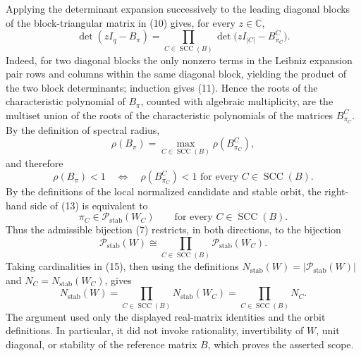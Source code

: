 Applying the determinant expansion successively to the leading diagonal blocks of the block-triangular matrix in (10) gives, for every \(z\in\mathbb C\),
\[
 \det(zI_q-B_\pi)
 =\prod_{C\in\operatorname{SCC}(B)}
   \det\bigl(zI_{|C|}-B^C_{\pi_C}\bigr). \tag{11}
\]
Indeed, for two diagonal blocks the only nonzero terms in the Leibniz expansion pair rows and columns within the same diagonal block, yielding the product of the two block determinants; induction gives (11). Hence the roots of the characteristic polynomial of \(B_\pi\), counted with algebraic multiplicity, are the multiset union of the roots of the characteristic polynomials of the matrices \(B^C_{\pi_C}\). By the definition of spectral radius,
\[
 \rho(B_\pi)
 =\max_{C\in\operatorname{SCC}(B)}\rho(B^C_{\pi_C}), \tag{12}
\]
and therefore
\[
 \rho(B_\pi)<1
 \quad\Longleftrightarrow\quad
 \rho(B^C_{\pi_C})<1
 \text{ for every }C\in\operatorname{SCC}(B). \tag{13}
\]
By the definitions of the local normalized candidate and stable orbit, the right-hand side of (13) is equivalent to
\[
 \pi_C\in\mathcal P_{\mathrm{stab}}(W_C)
 \qquad\text{for every }C\in\operatorname{SCC}(B). \tag{14}
\]
Thus the admissible bijection (7) restricts, in both directions, to the bijection
\[
 \mathcal P_{\mathrm{stab}}(W)
 \cong
 \prod_{C\in\operatorname{SCC}(B)}\mathcal P_{\mathrm{stab}}(W_C). \tag{15}
\]
Taking cardinalities in (15), then using the definitions \(N_{\mathrm{stab}}(W)=|\mathcal P_{\mathrm{stab}}(W)|\) and \(N_C=N_{\mathrm{stab}}(W_C)\), gives
\[
 N_{\mathrm{stab}}(W)
 =\prod_{C\in\operatorname{SCC}(B)}N_{\mathrm{stab}}(W_C)
 =\prod_{C\in\operatorname{SCC}(B)}N_C. \tag{16}
\]
The argument used only the displayed real-matrix identities and the orbit definitions. In particular, it did not invoke rationality, invertibility of \(W\), unit diagonal, or stability of the reference matrix \(B\), which proves the asserted scope.
